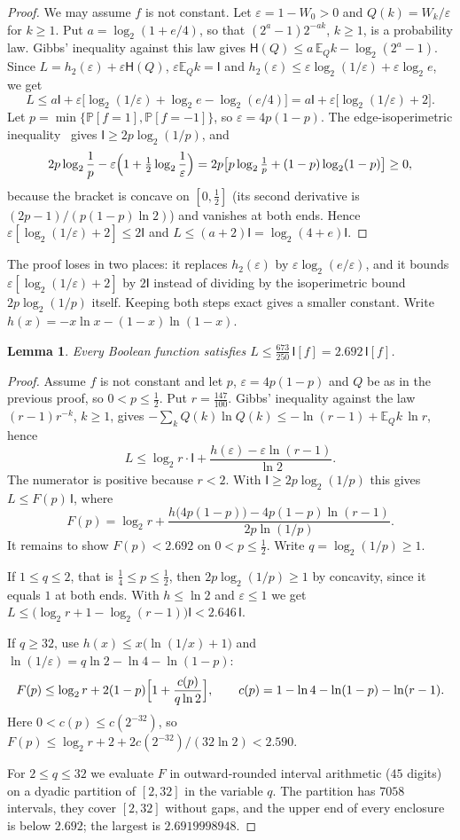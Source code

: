 \documentclass[11pt]{amsart}
\newtheorem{lemma}[theorem]{Lemma}
\theoremstyle{definition}
\theoremstyle{remark}
\newcommand{\E}{\mathbb E}
\renewcommand{\P}{\mathbb P}
\newcommand{\HH}{\mathsf H}
\newcommand{\I}{\mathsf I}
\newcommand{\eps}{\varepsilon}
\begin{document}
\begin{proof}
We may assume $f$ is not constant. Let $\eps=1-W_0>0$ and $Q(k)=W_k/\eps$ for $k\ge1$. Put $a=\log_2(1+e/4)$, so that $(2^a-1)2^{-ak}$, $k\ge1$, is a probability law. Gibbs' inequality against this law gives $\HH(Q)\le a\,\E_Qk-\log_2(2^a-1)$. Since $L=h_2(\eps)+\eps\HH(Q)$, $\eps\E_Qk=\I$ and $h_2(\eps)\le\eps\log_2(1/\eps)+\eps\log_2e$, we get
\[
 L\le a\I+\eps\bigl[\log_2(1/\eps)+\log_2e-\log_2(e/4)\bigr]=a\I+\eps\bigl[\log_2(1/\eps)+2\bigr].
\]
Let $p=\min\{\P[f=1],\P[f=-1]\}$, so $\eps=4p(1-p)$. The edge-isoperimetric inequality~\cite[Chapter~2]{OD14} gives $\I\ge2p\log_2(1/p)$, and
\[
 2p\log_2\frac1p-\eps\Bigl(1+\tfrac12\log_2\frac1\eps\Bigr)=2p\bigl[p\log_2\tfrac1p+(1-p)\log_2(1-p)\bigr]\ge0,
\]
because the bracket is concave on $[0,\tfrac12]$ (its second derivative is $(2p-1)/(p(1-p)\ln2)$) and vanishes at both ends. Hence $\eps[\log_2(1/\eps)+2]\le2\I$ and $L\le(a+2)\I=\log_2(4+e)\I$.
\end{proof}

The proof loses in two places: it replaces $h_2(\eps)$ by $\eps\log_2(e/\eps)$, and it bounds $\eps[\log_2(1/\eps)+2]$ by $2\I$ instead of dividing by the isoperimetric bound $2p\log_2(1/p)$ itself. Keeping both steps exact gives a smaller constant. Write $h(x)=-x\ln x-(1-x)\ln(1-x)$.

\begin{lemma}\label{lem:level2}
Every Boolean function satisfies $L\le\frac{673}{250}\,\I[f]=2.692\,\I[f]$.
\end{lemma}

\begin{proof}
Assume $f$ is not constant and let $p$, $\eps=4p(1-p)$ and $Q$ be as in the previous proof, so $0<p\le\tfrac12$. Put $r=\tfrac{147}{100}$. Gibbs' inequality against the law $(r-1)r^{-k}$, $k\ge1$, gives $-\sum_kQ(k)\ln Q(k)\le-\ln(r-1)+\E_Qk\,\ln r$, hence
\[
 L\le\log_2r\cdot\I+\frac{h(\eps)-\eps\ln(r-1)}{\ln2}.
\]
The numerator is positive because $r<2$. With $\I\ge2p\log_2(1/p)$ this gives $L\le F(p)\,\I$, where
\[
 F(p)=\log_2r+\frac{h\bigl(4p(1-p)\bigr)-4p(1-p)\ln(r-1)}{2p\ln(1/p)}.
\]
It remains to show $F(p)<2.692$ on $0<p\le\tfrac12$. Write $q=\log_2(1/p)\ge1$.

If $1\le q\le2$, that is $\tfrac14\le p\le\tfrac12$, then $2p\log_2(1/p)\ge1$ by concavity, since it equals $1$ at both ends. With $h\le\ln2$ and $\eps\le1$ we get $L\le\bigl(\log_2r+1-\log_2(r-1)\bigr)\I<2.646\,\I$.

If $q\ge32$, use $h(x)\le x\bigl(\ln(1/x)+1\bigr)$ and $\ln(1/\eps)=q\ln2-\ln4-\ln(1-p)$:
\[
 F(p)\le\log_2r+2(1-p)\Bigl[1+\frac{c(p)}{q\ln2}\Bigr],\qquad c(p)=1-\ln4-\ln(1-p)-\ln(r-1).
\]
Here $0<c(p)\le c(2^{-32})$, so $F(p)\le\log_2r+2+2c(2^{-32})/(32\ln2)<2.590$.

For $2\le q\le32$ we evaluate $F$ in outward-rounded interval arithmetic ($45$ digits) on a dyadic partition of $[2,32]$ in the variable $q$. The partition has $7058$ intervals, they cover $[2,32]$ without gaps, and the upper end of every enclosure is below $2.692$; the largest is $2.6919998948$.
\end{proof}
\end{document}
